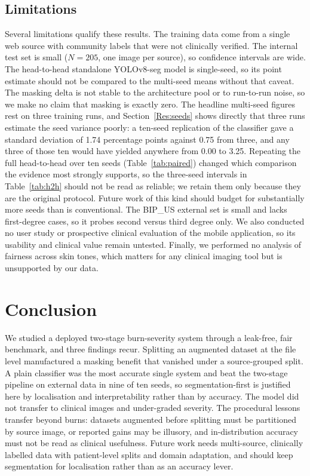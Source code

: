 \documentclass{elektr}
\begin{document}
\subsection{Limitations}
\label{Dis:lim}
Several limitations qualify these results. The training data come from a single web source with community labels that were not clinically verified. The internal test set is small ($N=205$, one image per source), so confidence intervals are wide. The head-to-head standalone YOLOv8-seg model is single-seed, so its point estimate should not be compared to the multi-seed means without that caveat. The masking delta is not stable to the architecture pool or to run-to-run noise, so we make no claim that masking is exactly zero. The headline multi-seed figures rest on three training runs, and Section~\ref{Res:seeds} shows directly that three runs estimate the seed variance poorly: a ten-seed replication of the classifier gave a standard deviation of 1.74 percentage points against 0.75 from three, and any three of those ten would have yielded anywhere from 0.00 to 3.25. Repeating the full head-to-head over ten seeds (Table~\ref{tab:paired}) changed which comparison the evidence most strongly supports, so the three-seed intervals in Table~\ref{tab:h2h} should not be read as reliable; we retain them only because they are the original protocol. Future work of this kind should budget for substantially more seeds than is conventional. The BIP\_US external set is small and lacks first-degree cases, so it probes second versus third degree only. We also conducted no user study or prospective clinical evaluation of the mobile application, so its usability and clinical value remain untested. Finally, we performed no analysis of fairness across skin tones, which matters for any clinical imaging tool but is unsupported by our data.

\section{Conclusion}
\label{Con}
We studied a deployed two-stage burn-severity system through a leak-free, fair benchmark, and three findings recur. Splitting an augmented dataset at the file level manufactured a masking benefit that vanished under a source-grouped split. A plain classifier was the most accurate single system and beat the two-stage pipeline on external data in nine of ten seeds, so segmentation-first is justified here by localisation and interpretability rather than by accuracy. The model did not transfer to clinical images and under-graded severity. The procedural lessons transfer beyond burns: datasets augmented before splitting must be partitioned by source image, or reported gains may be illusory, and in-distribution accuracy must not be read as clinical usefulness. Future work needs multi-source, clinically labelled data with patient-level splits and domain adaptation, and should keep segmentation for localisation rather than as an accuracy lever.
\end{document}
